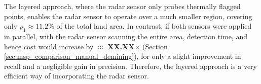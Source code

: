             The layered approach, where the radar sensor only probes thermally flagged points, enables the radar sensor to operate over a much smaller region, covering only $\rho_1 \approx 11.2\%$ of the total land area. In contrast, if both sensors were applied in parallel, with the radar sensor scanning the entire area, detection time, and hence cost would increase by 
            $\approx$ \textbf{XX.XX}$\times$ (Section \ref{sec:msp_comparison_manual_demining}), for only a slight improvement in recall and a negligible gain in precision. Therefore, the layered approach is a very efficient way of incorporating the radar sensor. 

            

        